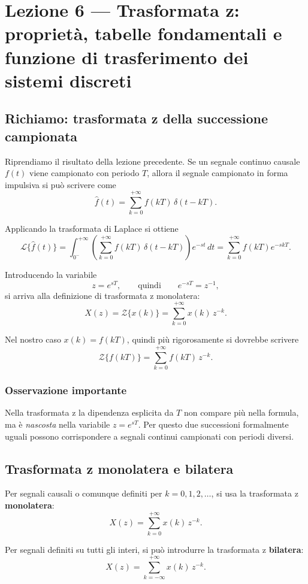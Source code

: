 \chapter{Lezione 6 --- Trasformata z: propriet\`a, tabelle fondamentali e funzione di trasferimento dei sistemi discreti}

\section{Richiamo: trasformata z della successione campionata}

Riprendiamo il risultato della lezione precedente. Se un segnale continuo causale \(f(t)\)
viene campionato con periodo \(T\), allora il segnale campionato in forma impulsiva si pu\`o scrivere come
\[
\hat f(t)=\sum_{k=0}^{+\infty} f(kT)\,\delta(t-kT).
\]

Applicando la trasformata di Laplace si ottiene
\[
\mathcal{L}\{\hat f(t)\}
=
\int_{0^-}^{+\infty}
\left(
\sum_{k=0}^{+\infty} f(kT)\,\delta(t-kT)
\right)e^{-st}\,dt
=
\sum_{k=0}^{+\infty} f(kT)e^{-skT}.
\]

Introducendo la variabile
\[
z=e^{sT},
\qquad\text{quindi}\qquad
e^{-sT}=z^{-1},
\]
si arriva alla definizione di trasformata z monolatera:
\[
X(z)=\mathcal{Z}\{x(k)\}
=
\sum_{k=0}^{+\infty} x(k)\,z^{-k}.
\]

Nel nostro caso \(x(k)=f(kT)\), quindi pi\`u rigorosamente si dovrebbe scrivere
\[
\mathcal{Z}\{f(kT)\}
=
\sum_{k=0}^{+\infty} f(kT)\,z^{-k}.
\]

\subsection*{Osservazione importante}

Nella trasformata z la dipendenza esplicita da \(T\) non compare pi\`u nella formula,
ma \`e \emph{nascosta} nella variabile \(z=e^{sT}\).
Per questo due successioni formalmente uguali possono corrispondere a segnali continui
campionati con periodi diversi.

\section{Trasformata z monolatera e bilatera}

Per segnali causali o comunque definiti per \(k=0,1,2,\dots\), si usa la trasformata z \textbf{monolatera}:
\[
X(z)=\sum_{k=0}^{+\infty} x(k)\,z^{-k}.
\]

Per segnali definiti su tutti gli interi, si pu\`o introdurre la trasformata z \textbf{bilatera}:
\[
X(z)=\sum_{k=-\infty}^{+\infty} x(k)\,z^{-k}.
\]

